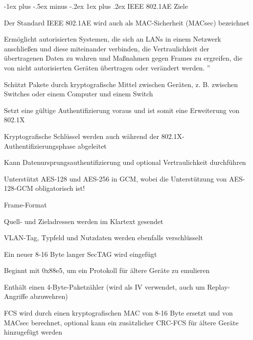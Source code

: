\documentclass[a4paper]{article}
\makeatletter
\renewcommand{\subsubsection}{\@startsection{subsubsection}{3}{0mm}%
 {-1ex plus -.5ex minus -.2ex}%
 {1ex plus .2ex}%
 {\normalfont\small\bfseries}}
\makeatother
\begin{document}
\begin{multicols}{3}
      \subsubsection{IEEE 802.1AE}
      Ziele
      \begin{itemize*}
            \item Der Standard IEEE 802.1AE wird auch als MAC-Sicherheit (MACsec) bezeichnet
            \item Ermöglicht autorisierten Systemen, die sich an LANs in einem Netzwerk anschließen und diese miteinander verbinden, die Vertraulichkeit der übertragenen Daten zu wahren und Maßnahmen gegen Frames zu ergreifen, die von nicht autorisierten Geräten übertragen oder verändert werden. ''
            \item Schützt Pakete durch kryptografische Mittel zwischen Geräten, z. B. zwischen Switches oder einem Computer und einem Switch
            \item Setzt eine gültige Authentifizierung voraus und ist somit eine Erweiterung von 802.1X
            \item Kryptografische Schlüssel werden auch während der 802.1X-Authentifizierungsphase abgeleitet
            \item Kann Datenursprungsauthentifizierung und optional Vertraulichkeit durchführen
            \item Unterstützt AES-128 und AES-256 in GCM, wobei die Unterstützung von AES-128-GCM obligatorisch ist!
      \end{itemize*}

      Frame-Format
      \begin{itemize*}
            \item Quell- und Zieladressen werden im Klartext gesendet
            \item VLAN-Tag, Typfeld und Nutzdaten werden ebenfalls verschlüsselt
            \item Ein neuer 8-16 Byte langer SecTAG wird eingefügt
            \begin{itemize*}
                  \item Beginnt mit 0x88e5, um ein Protokoll für ältere Geräte zu emulieren
                  \item Enthält einen 4-Byte-Paketzähler (wird als IV verwendet, auch um Replay-Angriffe abzuwehren)
            \end{itemize*}
            \item FCS wird durch einen kryptografischen MAC von 8-16 Byte ersetzt und von MACsec berechnet, optional kann ein zusätzlicher CRC-FCS für ältere Geräte hinzugefügt werden
      \end{itemize*}


\end{multicols}
\end{document}
